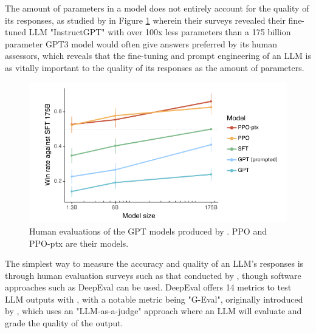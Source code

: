 \documentclass[12pt]{report}
\begin{document}
    The amount of parameters in a model does not entirely account for the quality of its responses, as studied by \textcite{ouyang_training_2022}
    in Figure \ref{fig:LLMPref} wherein their surveys revealed their fine-tuned LLM "InstructGPT" with over 100x less parameters than a 175 billion parameter 
    GPT3 model would often give answers preferred by its human assessors, which reveals that the fine-tuning and prompt engineering of an LLM is as vitally important
    to the quality of its responses as the amount of parameters.  
    

    \begin{figure}[H] 
        \centering
        \includegraphics[width=.65\linewidth]{ouyangLLMPreference.png}
        \caption{Human evaluations of the GPT models produced by \textcite{ouyang_training_2022}. PPO and PPO-ptx are their models.}
        \label{fig:LLMPref}
    \end{figure}

    The simplest way to measure the accuracy and quality of an LLM's responses is through human evaluation surveys such as that conducted by \textcite{ouyang_training_2022}, though
    software approaches such as DeepEval can be used. DeepEval offers 14 metrics to test LLM outputs with \autocite{deepeval_introduction_2024},
    with a notable metric being "G-Eval", originally introduced by \textcite{liu_g-eval_2023}, which uses an "LLM-as-a-judge" approach where an LLM will evaluate
    and grade the quality of the output.
\end{document}
